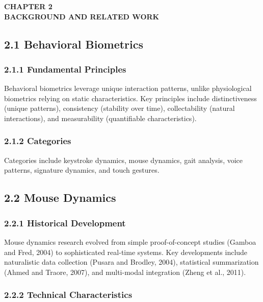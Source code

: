 \documentclass[
  11pt,
  a4paper,
]{article}
\begin{document}
\begin{center}
\vspace*{2cm}
\textbf{\Large CHAPTER 2}\\[0.5cm]
\textbf{\Large BACKGROUND AND RELATED WORK}
\end{center}

\newpage

\subsection{2.1 Behavioral Biometrics}\label{behavioral-biometrics}

\subsubsection{2.1.1 Fundamental
Principles}\label{fundamental-principles}

Behavioral biometrics leverage unique interaction patterns, unlike
physiological biometrics relying on static characteristics. Key
principles include distinctiveness (unique patterns), consistency
(stability over time), collectability (natural interactions), and
measurability (quantifiable characteristics).

\subsubsection{2.1.2 Categories}\label{categories}

Categories include keystroke dynamics, mouse dynamics, gait analysis,
voice patterns, signature dynamics, and touch gestures.

\subsection{2.2 Mouse Dynamics}\label{mouse-dynamics}

\subsubsection{2.2.1 Historical
Development}\label{historical-development}

Mouse dynamics research evolved from simple proof-of-concept studies
(Gamboa and Fred, 2004) to sophisticated real-time systems. Key
developments include naturalistic data collection (Pusara and Brodley,
2004), statistical summarization (Ahmed and Traore, 2007), and
multi-modal integration (Zheng et al., 2011).

\subsubsection{2.2.2 Technical
Characteristics}\label{technical-characteristics}
\end{document}
